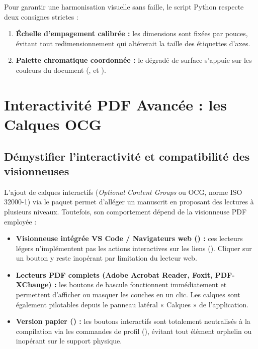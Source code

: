 Pour garantir une harmonisation visuelle sans faille, le script Python respecte deux consignes strictes :
\begin{enumerate}
  \item \textbf{Échelle d'empagement calibrée :} les dimensions sont fixées par  pouces,
  évitant tout redimensionnement qui altérerait la taille des étiquettes d'axes.
  \item \textbf{Palette chromatique coordonnée :} le dégradé de surface s'appuie sur les couleurs du document
  (,  et ).
\end{enumerate}

\section{Interactivité PDF Avancée : les Calques OCG}
\label{sec:interactivite-ocg}

\subsection{Démystifier l'interactivité et compatibilité des visionneuses}
L'ajout de calques interactifs (\textit{Optional Content Groups} ou OCG, norme ISO 32000-1)
via le paquet  permet d'alléger un manuscrit en proposant des lectures à plusieurs niveaux.
Toutefois, son comportement dépend de la visionneuse PDF employée :

\begin{itemize}
  \item \textbf{Visionneuse intégrée VS Code / Navigateurs web () :}
  ces lecteurs légers n'implémentent pas les actions interactives sur les liens ().
  Cliquer sur un bouton y reste inopérant par limitation du lecteur web.
  \item \textbf{Lecteurs PDF complets (Adobe Acrobat Reader, Foxit, PDF-XChange) :}
  les boutons de bascule fonctionnent immédiatement et permettent d'afficher ou masquer les couches en un clic.
  Les calques sont également pilotables depuis le panneau latéral « Calques » de l'application.
  \item \textbf{Version papier (\code{[print]}) :}
  les boutons interactifs sont totalement neutralisés à la compilation
  via les commandes de profil (),
  évitant tout élément orphelin ou inopérant sur le support physique.
\end{itemize}


